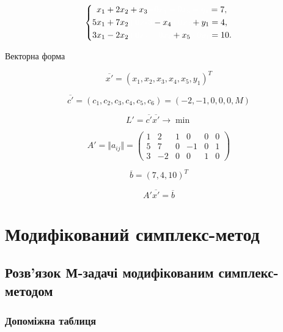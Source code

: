\documentclass[a4paper, 12pt]{article}
\begin{document}
\[
\left\{
\begin{aligned}
	x_1 &+ 2x_2 + x_3 \textcolor{white}{+ 0x_4 + 0x_5 + y_1} = 7,\\
	5x_1 &+ 7x_2 \textcolor{white}{+ 0x_33} - x_4 \textcolor{white}{+ 0x_5} + y_1 = 4,\\
	3x_1 &- 2x_2 \textcolor{white}{+ 0x_3 + 0x_4} + x_5 \textcolor{white}{+ 0y_1} = 10.\\ 
\end{aligned}
\right.
\]

Векторна форма

\begin{equation*}
\overline{x'} = \left(x_1, x_2, x_3, x_4, x_5, y_1\right)^T
\end{equation*}

\begin{equation*}
\overline{c'} = \left(c_1, c_2, c_3, c_4, c_5, c_6\right) = (-2,-1,0,0,0, M)
\end{equation*}

\begin{equation*}
L' = \overline{c'}\overline{x'} \rightarrow \min
\end{equation*}

\begin{equation*}
A' = \Vert a_{ij} \Vert = 
\begin{pmatrix}
	1 & 2 & 1 & 0 & 0 & 0\\
	5 & 7 & 0 & -1 & 0 & 1\\
	3 & -2 & 0 & 0 & 1 & 0
\end{pmatrix}
\end{equation*}

\begin{equation*}
 \overline{b} = \left( 7, 4, 10 \right)^T
\end{equation*}

\begin{equation*}
 A'\overline{x'} = \overline{b}
\end{equation*}


\section{Модифікований симплекс-метод}

\subsection{Розв'язок М-задачі модифікованим симплекс-методом}

\subsubsection{Допоміжна таблиця}
\end{document}
